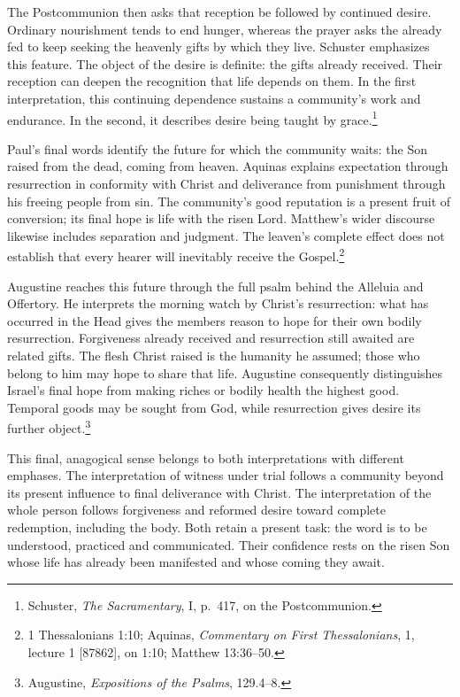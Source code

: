 The Postcommunion then asks that reception be followed by continued desire. Ordinary nourishment tends to end hunger, whereas the prayer asks the already fed to keep seeking the heavenly gifts by which they live. Schuster emphasizes this feature. The object of the desire is definite: the gifts already received. Their reception can deepen the recognition that life depends on them. In the first interpretation, this continuing dependence sustains a community's work and endurance. In the second, it describes desire being taught by grace.\footnote{Schuster, \textit{The Sacramentary}, I, p.~417, on the Postcommunion.}

Paul's final words identify the future for which the community waits: the Son raised from the dead, coming from heaven. Aquinas explains expectation through resurrection in conformity with Christ and deliverance from punishment through his freeing people from sin. The community's good reputation is a present fruit of conversion; its final hope is life with the risen Lord. Matthew's wider discourse likewise includes separation and judgment. The leaven's complete effect does not establish that every hearer will inevitably receive the Gospel.\footnote{1 Thessalonians 1:10; Aquinas, \textit{Commentary on First Thessalonians}, 1, lecture 1 [87862], on 1:10; Matthew 13:36--50.}

Augustine reaches this future through the full psalm behind the Alleluia and Offertory. He interprets the morning watch by Christ's resurrection: what has occurred in the Head gives the members reason to hope for their own bodily resurrection. Forgiveness already received and resurrection still awaited are related gifts. The flesh Christ raised is the humanity he assumed; those who belong to him may hope to share that life. Augustine consequently distinguishes Israel's final hope from making riches or bodily health the highest good. Temporal goods may be sought from God, while resurrection gives desire its further object.\footnote{Augustine, \textit{Expositions of the Psalms}, 129.4--8.}

This final, anagogical sense belongs to both interpretations with different emphases. The interpretation of witness under trial follows a community beyond its present influence to final deliverance with Christ. The interpretation of the whole person follows forgiveness and reformed desire toward complete redemption, including the body. Both retain a present task: the word is to be understood, practiced and communicated. Their confidence rests on the risen Son whose life has already been manifested and whose coming they await.
